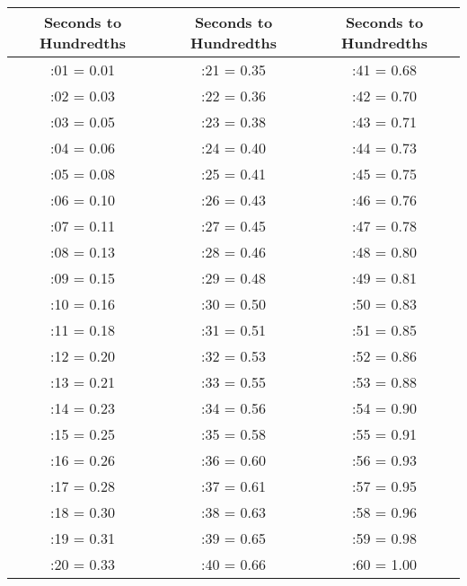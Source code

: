 \label{apdx:sec-to-hdth-conversion}
\begin{tabular}{ |c|c|c| }
  \hline
  {\tiny Seconds to Hundredths} & 
  {\tiny Seconds to Hundredths} & 
  {\tiny Seconds to Hundredths} \\
  \hline
  :01 = 0.01 & :21 = 0.35 & :41 = 0.68 \\
  :02 = 0.03 & :22 = 0.36 & :42 = 0.70 \\
  :03 = 0.05 & :23 = 0.38 & :43 = 0.71 \\
  :04 = 0.06 & :24 = 0.40 & :44 = 0.73 \\
  :05 = 0.08 & :25 = 0.41 & :45 = 0.75 \\
  \hline
  :06 = 0.10 & :26 = 0.43 & :46 = 0.76 \\
  :07 = 0.11 & :27 = 0.45 & :47 = 0.78 \\
  :08 = 0.13 & :28 = 0.46 & :48 = 0.80 \\
  :09 = 0.15 & :29 = 0.48 & :49 = 0.81 \\
  :10 = 0.16 & :30 = 0.50 & :50 = 0.83 \\
  \hline
  :11 = 0.18 & :31 = 0.51 & :51 = 0.85 \\
 :12 = 0.20 & :32 = 0.53 & :52 = 0.86 \\
 :13 = 0.21 & :33 = 0.55 & :53 = 0.88 \\
 :14 = 0.23 & :34 = 0.56 & :54 = 0.90 \\
 :15 = 0.25 & :35 = 0.58 & :55 = 0.91 \\
  \hline
  :16 = 0.26 & :36 = 0.60 & :56 = 0.93 \\
 :17 = 0.28 & :37 = 0.61 & :57 = 0.95 \\
 :18 = 0.30 & :38 = 0.63 & :58 = 0.96 \\
 :19 = 0.31 & :39 = 0.65 & :59 = 0.98 \\
 :20 = 0.33 & :40 = 0.66 & :60 = 1.00 \\
  \hline
\end{tabular}

